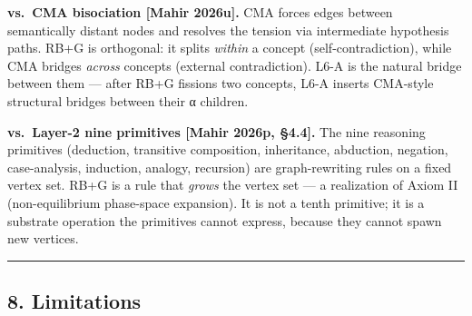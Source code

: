\documentclass[
  11pt,
  a4paper,
]{article}
\begin{document}
\textbf{vs.~CMA bisociation {[}Mahir 2026u{]}.} CMA forces edges between
semantically distant nodes and resolves the tension via intermediate
hypothesis paths. RB+G is orthogonal: it splits \emph{within} a concept
(self-contradiction), while CMA bridges \emph{across} concepts (external
contradiction). L6-A is the natural bridge between them --- after RB+G
fissions two concepts, L6-A inserts CMA-style structural bridges between
their α children.

\textbf{vs.~Layer-2 nine primitives {[}Mahir 2026p, §4.4{]}.} The nine
reasoning primitives (deduction, transitive composition, inheritance,
abduction, negation, case-analysis, induction, analogy, recursion) are
graph-rewriting rules on a fixed vertex set. RB+G is a rule that
\emph{grows} the vertex set --- a realization of Axiom II
(non-equilibrium phase-space expansion). It is not a tenth primitive; it
is a substrate operation the primitives cannot express, because they
cannot spawn new vertices.

\begin{center}\rule{0.5\linewidth}{0.5pt}\end{center}

\subsection{8. Limitations}\label{limitations}
\end{document}
